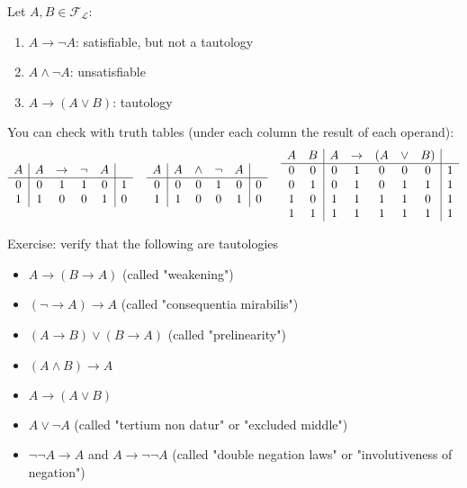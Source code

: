 \documentclass[11pt]{article}
\begin{document}
	Let $A,B \in \mathcal{F}_\mathcal{L}$:
	\begin{enumerate}
		\item $A \rightarrow \neg A$: satisfiable, but not a tautology
		\item $A \wedge \neg A$: unsatisfiable 
		\item $A \rightarrow (A \vee B)$: tautology
	\end{enumerate}
	You can check with truth tables (under each column the result of each operand):
	$$
	\begin{array}{c | c c c c | c}
		A & A & \rightarrow & \neg & A & \\
		\hline
		0 & 0 & 1 & 1 & 0 & 1\\
		1 & 1 & 0 & 0 & 1 & 0\\
	\end{array}
	\;\;\;\;
	\begin{array}{c | c c c c | c}
		A & A & \wedge & \neg & A & \\
		\hline
		0 & 0 & 0 & 1 & 0 & 0\\
		1 & 1 & 0 & 0 & 1 & 0\\
	\end{array}
	\;\;\;\;
	\begin{array}{c c | c c c c c | c}
		A & B & A & \rightarrow & (A & \vee & B) & \\
		\hline
		0 & 0 & 0 & 1 & 0 & 0 & 0 & 1\\
		0 & 1 & 0 & 1 & 0 & 1 & 1 & 1\\
		1 & 0 & 1 & 1 & 1 & 1 & 0& 1 \\
		1 & 1 & 1 & 1 & 1 & 1 & 1 & 1\\
	\end{array}
	$$
	
	\newpage
	
	Exercise: verify that the following are tautologies
	\begin{itemize}
		\item $A \rightarrow (B \rightarrow A)$ (called "weakening")
		\item $(\neg \rightarrow A) \rightarrow A$ (called "consequentia mirabilis")
		\item $(A \rightarrow B) \vee (B \rightarrow A)$ (called "prelinearity")
		\item $(A \wedge B) \rightarrow A$
		\item $A \rightarrow (A \vee B)$
		\item $A \vee \neg A$ (called "tertium non datur" or "excluded middle")
		\item $\neg \neg A \rightarrow A$ and $A \rightarrow \neg \neg A$ (called "double negation laws" or "involutiveness of negation")
	\end{itemize}
	
\end{document}
